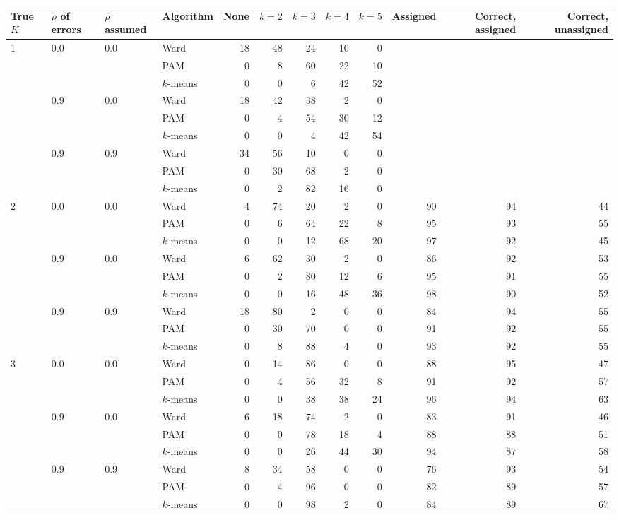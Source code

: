 \begin{tabular}{llllrrrrrrrr}
\toprule
True $K$ & $\rho$ of errors & $\rho$ assumed & Algorithm & None & $k = 2$ & $k = 3$ & $k = 4$ & $k = 5$ & Assigned & Correct, assigned & Correct, unassigned \\
\midrule
1 & 0.0 & 0.0 & Ward & 18 & 48 & 24 & 10 & 0 &  &  &  \\
 &  &  & PAM & 0 & 8 & 60 & 22 & 10 &  &  &  \\
 &  &  & $k$-means & 0 & 0 & 6 & 42 & 52 &  &  &  \\
 & 0.9 & 0.0 & Ward & 18 & 42 & 38 & 2 & 0 &  &  &  \\
 &  &  & PAM & 0 & 4 & 54 & 30 & 12 &  &  &  \\
 &  &  & $k$-means & 0 & 0 & 4 & 42 & 54 &  &  &  \\
 & 0.9 & 0.9 & Ward & 34 & 56 & 10 & 0 & 0 &  &  &  \\
 &  &  & PAM & 0 & 30 & 68 & 2 & 0 &  &  &  \\
 &  &  & $k$-means & 0 & 2 & 82 & 16 & 0 &  &  &  \\
2 & 0.0 & 0.0 & Ward & 4 & 74 & 20 & 2 & 0 & 90 & 94 & 44 \\
 &  &  & PAM & 0 & 6 & 64 & 22 & 8 & 95 & 93 & 55 \\
 &  &  & $k$-means & 0 & 0 & 12 & 68 & 20 & 97 & 92 & 45 \\
 & 0.9 & 0.0 & Ward & 6 & 62 & 30 & 2 & 0 & 86 & 92 & 53 \\
 &  &  & PAM & 0 & 2 & 80 & 12 & 6 & 95 & 91 & 55 \\
 &  &  & $k$-means & 0 & 0 & 16 & 48 & 36 & 98 & 90 & 52 \\
 & 0.9 & 0.9 & Ward & 18 & 80 & 2 & 0 & 0 & 84 & 94 & 55 \\
 &  &  & PAM & 0 & 30 & 70 & 0 & 0 & 91 & 92 & 55 \\
 &  &  & $k$-means & 0 & 8 & 88 & 4 & 0 & 93 & 92 & 55 \\
3 & 0.0 & 0.0 & Ward & 0 & 14 & 86 & 0 & 0 & 88 & 95 & 47 \\
 &  &  & PAM & 0 & 4 & 56 & 32 & 8 & 91 & 92 & 57 \\
 &  &  & $k$-means & 0 & 0 & 38 & 38 & 24 & 96 & 94 & 63 \\
 & 0.9 & 0.0 & Ward & 6 & 18 & 74 & 2 & 0 & 83 & 91 & 46 \\
 &  &  & PAM & 0 & 0 & 78 & 18 & 4 & 88 & 88 & 51 \\
 &  &  & $k$-means & 0 & 0 & 26 & 44 & 30 & 94 & 87 & 58 \\
 & 0.9 & 0.9 & Ward & 8 & 34 & 58 & 0 & 0 & 76 & 93 & 54 \\
 &  &  & PAM & 0 & 4 & 96 & 0 & 0 & 82 & 89 & 57 \\
 &  &  & $k$-means & 0 & 0 & 98 & 2 & 0 & 84 & 89 & 67 \\
\bottomrule
\end{tabular}
